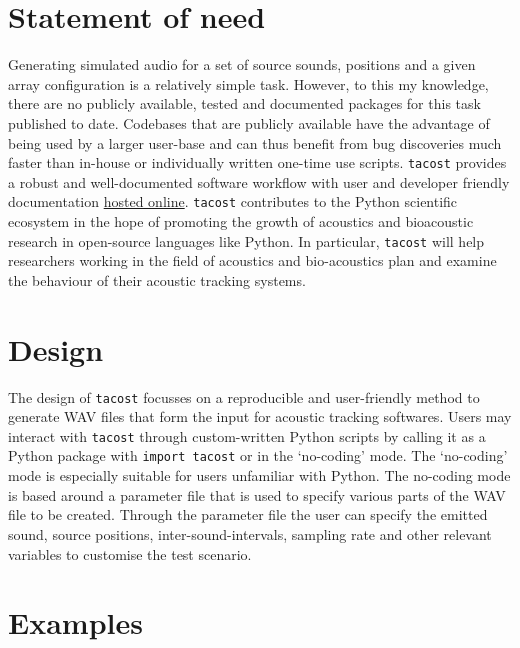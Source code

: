 \documentclass[
]{book}
\begin{document}
\hypertarget{statement-of-need}{%
\section{Statement of need}\label{statement-of-need}}

Generating simulated audio for a set of source sounds, positions and a given array configuration is a relatively simple task. However, to this my knowledge, there are no publicly available, tested and documented packages for this task published to date. Codebases that are publicly available have the advantage of being used by a larger user-base and can thus benefit from bug discoveries much faster than in-house or individually written one-time use scripts. \texttt{tacost} provides a robust and well-documented software workflow \citep{Taschuk2016} with user and developer friendly documentation \href{https://tacost.readthedocs.io/en/latest/}{hosted online}. \texttt{tacost} contributes to the Python scientific ecosystem in the hope of promoting the growth of acoustics and bioacoustic research in open-source languages like Python. In particular, \texttt{tacost} will help researchers working in the field of acoustics and bio-acoustics \citep{deframond2020} plan and examine the behaviour of their acoustic tracking systems.

\hypertarget{design}{%
\section{Design}\label{design}}

The design of \texttt{tacost} focusses on a reproducible and user-friendly method \citep{Wilson2012} to generate WAV files that form the input for acoustic tracking softwares. Users may interact with \texttt{tacost} through custom-written Python scripts
by calling it as a Python package with \texttt{import\ tacost} or in the `no-coding' mode. The `no-coding' mode is especially suitable for users unfamiliar with Python. The no-coding mode is based around a parameter file that is used to specify various parts of the WAV file to be created.
Through the parameter file the user can specify the emitted sound, source positions, inter-sound-intervals, sampling rate and other relevant variables to customise the test scenario.

\hypertarget{examples}{%
\section{Examples}\label{examples}}
\end{document}
